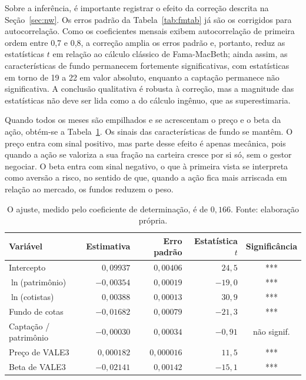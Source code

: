 \documentclass[12pt,a4paper]{article}
\begin{document}
Sobre a inferência, é importante registrar o efeito da correção descrita na Seção~\ref{sec:nw}.
Os erros padrão da Tabela~\ref{tab:fmtab} já são os corrigidos para autocorrelação. Como os
coeficientes mensais exibem autocorrelação de primeira ordem entre 0,7 e 0,8, a correção amplia os
erros padrão e, portanto, reduz as estatísticas $t$ em relação ao cálculo clássico de
Fama-MacBeth; ainda assim, as características de fundo permanecem fortemente significativas, com
estatísticas em torno de 19 a 22 em valor absoluto, enquanto a captação permanece não
significativa. A conclusão qualitativa é robusta à correção, mas a magnitude das estatísticas não
deve ser lida como a do cálculo ingênuo, que as superestimaria.

Quando todos os meses são empilhados e se acrescentam o preço e o beta da ação, obtém-se a
Tabela~\ref{tab:pool}. Os sinais das características de fundo se mantêm. O preço entra com sinal
positivo, mas parte desse efeito é apenas mecânica, pois quando a ação se valoriza a sua fração na
carteira cresce por si só, sem o gestor negociar. O beta entra com sinal negativo, o que à
primeira vista se interpreta como aversão a risco, no sentido de que, quando a ação fica mais
arriscada em relação ao mercado, os fundos reduzem o peso.

\begin{table}[h]\centering\small
\caption{Regressão com todos os meses empilhados, incluindo preço e beta (11.413 observações).}
\label{tab:pool}
\begin{tabular}{@{}lrrrc@{}}
\toprule
Variável & Estimativa & Erro padrão & Estatística $t$ & Significância \\
\midrule
Intercepto              & $0{,}09937$  & $0{,}00406$ & $24{,}5$   & *** \\
$\ln$(patrimônio)       & $-0{,}00354$ & $0{,}00019$ & $-19{,}0$  & *** \\
$\ln$(cotistas)         & $0{,}00388$  & $0{,}00013$ & $30{,}9$   & *** \\
Fundo de cotas          & $-0{,}01682$ & $0{,}00079$ & $-21{,}3$  & *** \\
Captação / patrimônio   & $-0{,}00030$ & $0{,}00034$ & $-0{,}91$  & não signif. \\
Preço de VALE3          & $0{,}000182$ & $0{,}000016$& $11{,}5$   & *** \\
Beta de VALE3           & $-0{,}02141$ & $0{,}00142$ & $-15{,}1$  & *** \\
\bottomrule
\end{tabular}
\caption*{\footnotesize O ajuste, medido pelo coeficiente de determinação, é de $0{,}166$.
Fonte: elaboração própria.}
\end{table}
\end{document}
